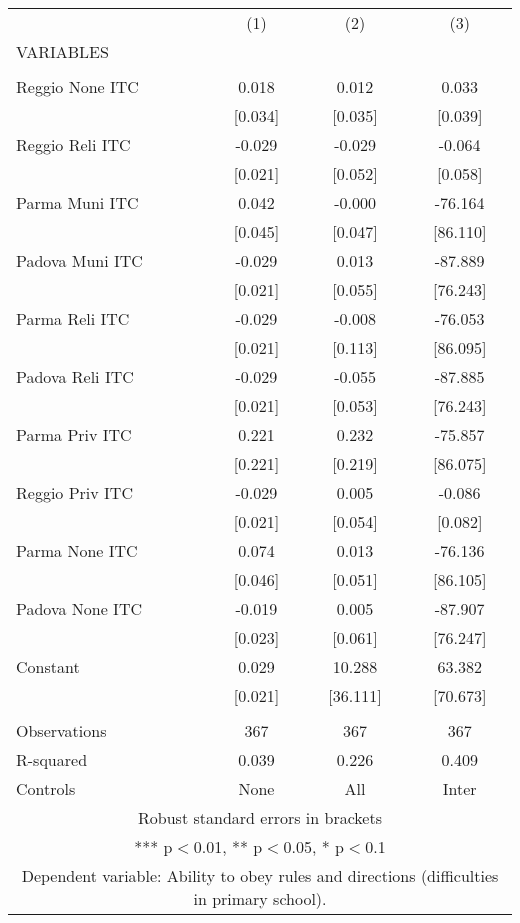\begin{tabular}{lccc} \hline
 & (1) & (2) & (3) \\
VARIABLES &  &  &  \\ \hline
 &  &  &  \\
Reggio None ITC & 0.018 & 0.012 & 0.033 \\
 & [0.034] & [0.035] & [0.039] \\
Reggio Reli ITC & -0.029 & -0.029 & -0.064 \\
 & [0.021] & [0.052] & [0.058] \\
Parma Muni ITC & 0.042 & -0.000 & -76.164 \\
 & [0.045] & [0.047] & [86.110] \\
Padova Muni ITC & -0.029 & 0.013 & -87.889 \\
 & [0.021] & [0.055] & [76.243] \\
Parma Reli ITC & -0.029 & -0.008 & -76.053 \\
 & [0.021] & [0.113] & [86.095] \\
Padova Reli ITC & -0.029 & -0.055 & -87.885 \\
 & [0.021] & [0.053] & [76.243] \\
Parma Priv ITC & 0.221 & 0.232 & -75.857 \\
 & [0.221] & [0.219] & [86.075] \\
Reggio Priv ITC & -0.029 & 0.005 & -0.086 \\
 & [0.021] & [0.054] & [0.082] \\
Parma None ITC & 0.074 & 0.013 & -76.136 \\
 & [0.046] & [0.051] & [86.105] \\
Padova None ITC & -0.019 & 0.005 & -87.907 \\
 & [0.023] & [0.061] & [76.247] \\
Constant & 0.029 & 10.288 & 63.382 \\
 & [0.021] & [36.111] & [70.673] \\
 &  &  &  \\
Observations & 367 & 367 & 367 \\
R-squared & 0.039 & 0.226 & 0.409 \\
 Controls & None & All & Inter \\ \hline
\multicolumn{4}{c}{ Robust standard errors in brackets} \\
\multicolumn{4}{c}{ *** p$<$0.01, ** p$<$0.05, * p$<$0.1} \\
\multicolumn{4}{c}{ Dependent variable: Ability to obey rules and directions (difficulties in primary school).} \\
\end{tabular}
